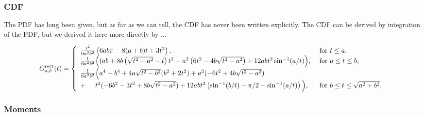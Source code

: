 \subsubsection{CDF}

The PDF has long been given, but as far as we can tell, the CDF has
never been written explicitly.  The CDF can be derived by integration
of the PDF, but we derived it here more directly by ...

\begin{equation}
  G^{\rm rect}_{a,b}(t)  = \left\{
    \begin{array}{ll}
     \frac{t^2}{6 a^2 b^2} \left( 
       6 a b \pi - 8(a+b) t + 3 t^2
             \right),  
         & \mbox{ for } t \leq a, \\
     \frac{1}{6 a^2 b^2} \Big( 
       (ab + 8 b \left( \sqrt{t^2 - a^2} -t \right) t^2
          - a^2 \left( 6 t^2 - 4 b  \sqrt{t^2 - a^2} \right)
          + 12 a b t^2 \sin^{-1}(a/t)
             \Big),  
         & \mbox{ for } a \leq t \leq b, \\
     \frac{1}{6 a^2 b^2} \Big( 
         a^4 + b^4
        + 4 a \sqrt{t^2 - b^2} (b^2 + 2 t^2)
        + a^2 (-6 t^2 + 4 b \sqrt{t^2 - a^2}) & \\
        + \hspace{5mm} t^2 (-6 b^2 - 3 t^2 + 8 b \sqrt{t^2 - a^2})
        + 12 a b t^2 \left( 
                       \sin^{-1}(b/t) - \pi/2 + \sin^{-1}(a/t)
                     \right)
      \Big),
         & \mbox{ for } b \leq t \leq \sqrt{a^2 + b^2}, \\
    \end{array} \right. 
  \label{eqn:rectangle_cdf}   
\end{equation}


\subsubsection{Moments}


